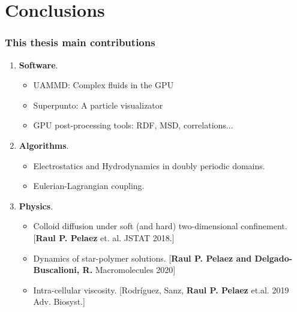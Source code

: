 \documentclass[xcolor=dvipsnames, compress]{beamer}
\begin{document}
\section{Conclusions}
\begin{frame}
  \frametitle{This thesis main contributions}
  \begin{enumerate}
    \Large\color{blue}
  \item \textbf{Software}.
    \begin{itemize}
    \item<+-> UAMMD: Complex fluids in the GPU      
    \item<+-> Superpunto: A particle visualizator
    \item<+-> GPU post-processing tools: RDF, MSD, correlations...
    \end{itemize}
  \item<+-> \textbf{Algorithms}.
    \begin{itemize}
    \item<+-> Electrostatics and Hydrodynamics in doubly periodic domains.
    \item<+-> Eulerian-Lagrangian coupling.
    \end{itemize}
  \item<+-> \textbf{Physics}.
    \begin{itemize}
    \item<+-> {Colloid diffusion under soft (and hard) two-dimensional confinement.\newline
        {\scriptsize [{\bf Raul P. Pelaez} et. al. JSTAT 2018.]}}
      \item<+-> {Dynamics of star-polymer solutions.\newline
          {\scriptsize [{\bf Raul P. Pelaez and Delgado-Buscalioni, R.} Macromolecules 2020]}}
      \item<+-> {Intra-cellular viscosity.\newline
          {\scriptsize [Rodríguez, Sanz, {\bf Raul P. Pelaez} et.al. 2019 Adv. Biosyst.]}}
    \end{itemize}
  \end{enumerate}
\end{frame}
\end{document}
